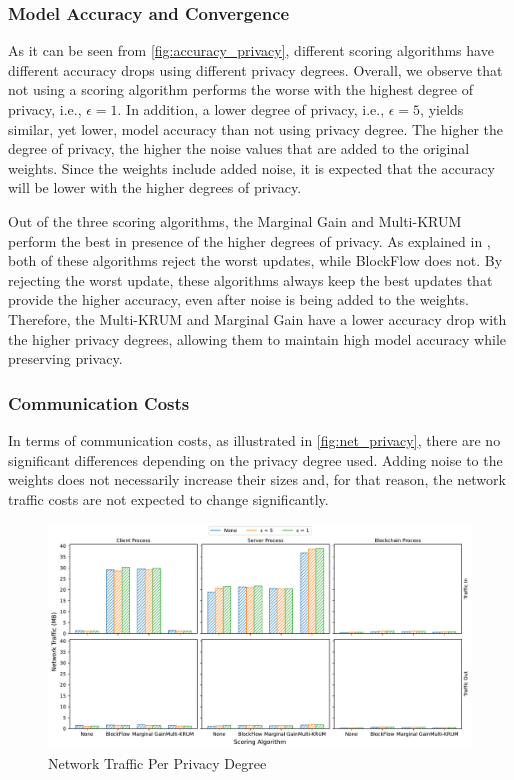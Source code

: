\subsubsection{Model Accuracy and Convergence}

As it can be seen from \autoref{fig:accuracy_privacy}, different scoring algorithms have different accuracy drops using different privacy degrees. Overall, we observe that not using a scoring algorithm performs the worse with the highest degree of privacy, i.e., $\epsilon = 1$. In addition, a lower degree of privacy, i.e., $\epsilon = 5$, yields similar, yet lower, model accuracy than not using privacy degree. The higher the degree of privacy, the higher the noise values that are added to the original weights. Since the weights include added noise, it is expected that the accuracy will be lower with the higher degrees of privacy.

Out of the three scoring algorithms, the Marginal Gain and Multi-KRUM perform the best in presence of the higher degrees of privacy. As explained in , both of these algorithms reject the worst updates, while BlockFlow does not. By rejecting the worst update, these algorithms always keep the best updates that provide the higher accuracy, even after noise is being added to the weights. Therefore, the Multi-KRUM and Marginal Gain have a lower accuracy drop with the higher privacy degrees, allowing them to maintain high model accuracy while preserving privacy.

\subsubsection{Communication Costs}

In terms of communication costs, as illustrated in \autoref{fig:net_privacy}, there are no significant differences depending on the privacy degree used. Adding noise to the weights does not necessarily increase their sizes and, for that reason, the network traffic costs are not expected to change significantly.

\begin{figure}[!h]
    \centering
    \includegraphics[width=\textwidth]{graphics/privacy/traffic.pdf}
    \caption{Network Traffic Per Privacy Degree}
    \label{fig:net_privacy}
\end{figure}

